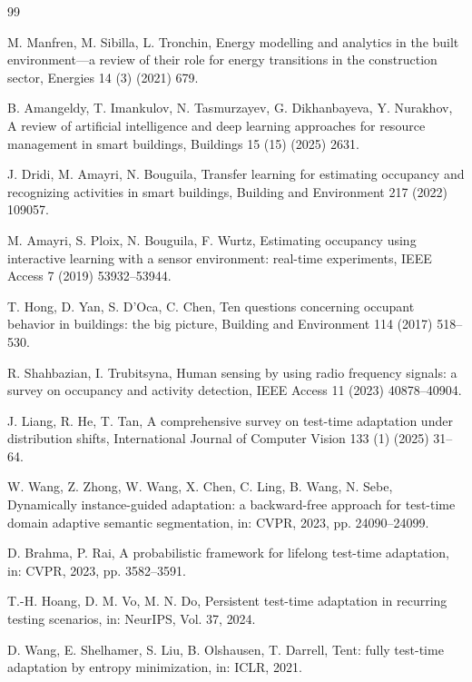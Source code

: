 \documentclass[a4paper,fleqn]{cas-dc}
\begin{document}
\begin{thebibliography}{99}

 M. Manfren, M. Sibilla, L. Tronchin, Energy modelling and analytics
in the built environment---a review of their role for energy transitions in the
construction sector, Energies 14 (3) (2021) 679.

 B. Amangeldy, T. Imankulov, N. Tasmurzayev, G. Dikhanbayeva,
Y. Nurakhov, A review of artificial intelligence and deep learning approaches for resource
management in smart buildings, Buildings 15 (15) (2025) 2631.

 J. Dridi, M. Amayri, N. Bouguila, Transfer learning for estimating
occupancy and recognizing activities in smart buildings, Building and Environment 217
(2022) 109057.

 M. Amayri, S. Ploix, N. Bouguila, F. Wurtz, Estimating occupancy using
interactive learning with a sensor environment: real-time experiments, IEEE Access 7 (2019)
53932--53944.

 T. Hong, D. Yan, S. D'Oca, C. Chen, Ten questions concerning occupant
behavior in buildings: the big picture, Building and Environment 114 (2017) 518--530.

 R. Shahbazian, I. Trubitsyna, Human sensing by using radio
frequency signals: a survey on occupancy and activity detection, IEEE Access 11 (2023)
40878--40904.

 J. Liang, R. He, T. Tan, A comprehensive survey on test-time adaptation
under distribution shifts, International Journal of Computer Vision 133 (1) (2025) 31--64.

 W. Wang, Z. Zhong, W. Wang, X. Chen, C. Ling, B. Wang, N. Sebe, Dynamically
instance-guided adaptation: a backward-free approach for test-time domain adaptive semantic
segmentation, in: CVPR, 2023, pp. 24090--24099.

 D. Brahma, P. Rai, A probabilistic framework for lifelong test-time
adaptation, in: CVPR, 2023, pp. 3582--3591.

 T.-H. Hoang, D. M. Vo, M. N. Do, Persistent test-time adaptation in
recurring testing scenarios, in: NeurIPS, Vol. 37, 2024.

 D. Wang, E. Shelhamer, S. Liu, B. Olshausen, T. Darrell, Tent: fully
test-time adaptation by entropy minimization, in: ICLR, 2021.


\end{thebibliography}
\end{document}
